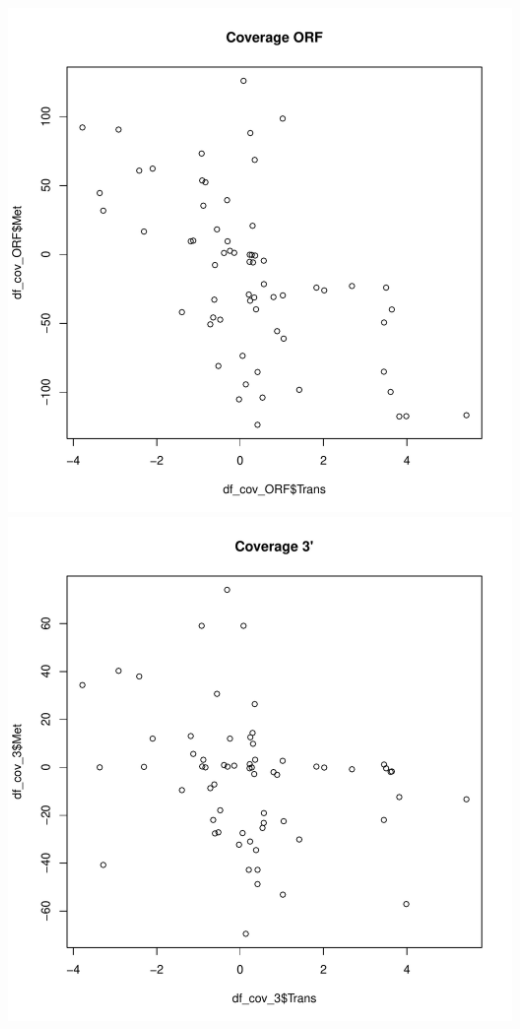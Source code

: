\documentclass{article}\usepackage[]{graphicx}\usepackage[]{color}
\makeatletter
\def\maxwidth{ %
  \ifdim\Gin@nat@width>\linewidth
    \linewidth
  \else
    \Gin@nat@width
  \fi
}
\newenvironment{knitrout}{}{} %
\makeatother
\begin{document}
\begin{knitrout}
{\includegraphics[width=\maxwidth]{figure/minimal-correlacions_met-5} 
\includegraphics[width=\maxwidth]{figure/minimal-correlacions_met-6} 
}
\end{knitrout}
\end{document}

